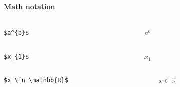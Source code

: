 \documentclass{beamer}
\begin{document}
	\begin{frame}[fragile]
		\frametitle{\secname}
		\framesubtitle{Math notation}
		\begin{columns}
			\begin{column}{0.6\textwidth}
				\begin{example}[Powers]
					\begin{lstlisting}[numbers=none, gobble=24]
						$a^{b}$
					\end{lstlisting}
				\end{example}
			\end{column}
			\begin{column}{0.4\textwidth}
				\Huge
				$a^{b}$
			\end{column}
		\end{columns}
		\begin{columns}
			\begin{column}{0.6\textwidth}
				\begin{example}[Subscript]
					\begin{lstlisting}[numbers=none, gobble=24]
						$x_{1}$
					\end{lstlisting}
				\end{example}
			\end{column}
			\begin{column}{0.4\textwidth}
				\Huge
				$x_{1}$
			\end{column}
		\end{columns}
		\begin{columns}
			\begin{column}{0.6\textwidth}
				\begin{example}[Element Of]
					\begin{lstlisting}[numbers=none, gobble=24]
						$x \in \mathbb{R}$
					\end{lstlisting}
				\end{example}
			\end{column}
			\begin{column}{0.4\textwidth}
				\Huge
				$x \in \mathbb{R}$
			\end{column}
		\end{columns}
	\end{frame}
\end{document}
